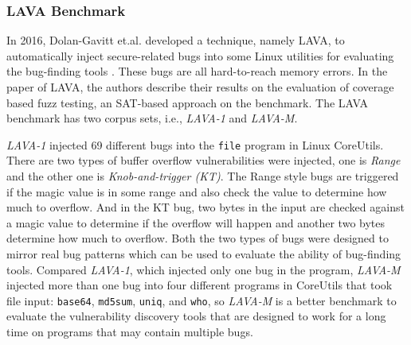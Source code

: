 
\subsubsection{LAVA Benchmark}
In 2016, Dolan-Gavitt et.al. developed a technique, namely LAVA, to automatically inject secure-related bugs into some Linux utilities for evaluating the bug-finding tools \cite{dolan2016lava}. These bugs are all hard-to-reach memory errors. In the paper of LAVA, the authors describe their results on the evaluation of coverage based fuzz testing, an SAT-based approach on the benchmark. The LAVA benchmark has two corpus sets, i.e., \textit{LAVA-1} and \textit{LAVA-M}.

\textit{LAVA-1} injected 69 different bugs into the \texttt{file} program in Linux CoreUtils. There are two types of buffer overflow vulnerabilities were injected, one is \emph{Range} and the other one is \emph{Knob-and-trigger (KT)}. The Range style bugs are triggered if the magic value is in some range and also check the value to determine how much to overflow. And in the KT bug, two bytes in the input are checked against a magic value to determine if the overflow will happen and another two bytes determine how much to overflow. Both the two types of bugs were designed to mirror real bug patterns which can be used to evaluate the ability of bug-finding tools. Compared \textit{LAVA-1}, which injected only one bug in the program, \textit{LAVA-M} injected more than one bug into four different programs in CoreUtils that took file input: \texttt{base64}, \texttt{md5sum}, \texttt{uniq}, and \texttt{who}, so \textit{LAVA-M} is a better benchmark to evaluate the vulnerability discovery tools that are designed to work for a long time on programs that may contain multiple bugs.

